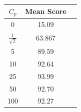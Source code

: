 \documentclass[letterpaper]{article}
\begin{document}
\begin{table}
\label{tbl:noSquashing}
\centering
\begin{tabular}{c c c}
\hline
$C_p$ & Mean Score \\
\hline
0 & 15.09 \\
$\frac{1}{\sqrt{2}}$ & 63.867 \\
5 & 89.59 \\
10 & 92.64 \\
25 & 93.99 \\
50 & 92.70 \\
100 & 92.27 \\
\hline
\end{tabular}
\end{table}


%
%
\end{document}
